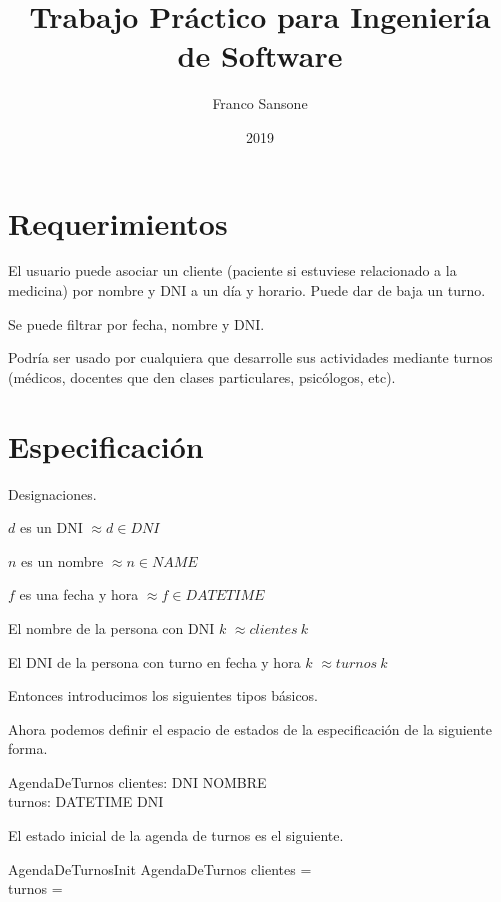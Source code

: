 \documentclass[%
  fleqn,colorlinks,linkcolor=blue,citecolor=blue,urlcolor=blue]{eptcs}
\title{Trabajo Pr\'actico para Ingenier\'i{}a de Software}
\author{Franco Sansone}
\date{2019}
\newcommand{\desig}[2]{\item #1 $\approx #2$}
\newenvironment{designations}
  {\begin{leftbar}
    \begin{list}{}{\setlength{\labelsep}{0cm}
                   \setlength{\labelwidth}{0cm}
                   \setlength{\listparindent}{0cm}
                   \setlength{\rightmargin}{\leftmargin}}}
  {\end{list}\end{leftbar}}
\begin{document}
  \thispagestyle{empty}
  \maketitle

  \section{Requerimientos}
  El usuario puede asociar un cliente (paciente si estuviese relacionado a la medicina) por nombre y DNI a un d\'i{}a y horario. Puede dar de baja un turno.

  Se puede filtrar por fecha, nombre y DNI.

  Podr\'i{}a ser usado por cualquiera que desarrolle sus actividades mediante turnos (m\'edicos, docentes que den clases particulares, psic\'ologos, etc).

  \section{Especificaci\'on}
  Designaciones.

  \begin{designations}
  \desig{$d$ es un DNI}{d \in DNI}
  \desig{$n$ es un nombre}{n \in NAME}
  \desig{$f$ es una fecha y hora}{f \in DATETIME}
  \desig{El nombre de la persona con DNI $k$}{clientes~k}
  \desig{El DNI de la persona con turno en fecha y hora $k$}{turnos~k}
  \end{designations}

  Entonces introducimos los siguientes tipos b\'asicos.

  \begin{zed}
  \end{zed}

  Ahora podemos definir el espacio de estados de la especificaci\'on de la siguiente forma.

  \begin{schema}{AgendaDeTurnos}
  clientes: DNI \pfun NOMBRE \\
  turnos: DATETIME \pfun DNI
  \end{schema}

  El estado inicial de la agenda de turnos es el siguiente.

  \begin{schema}{AgendaDeTurnosInit}
  AgendaDeTurnos
  \where
  clientes = \emptyset \\
  turnos = \emptyset
  \end{schema}
\end{document}
